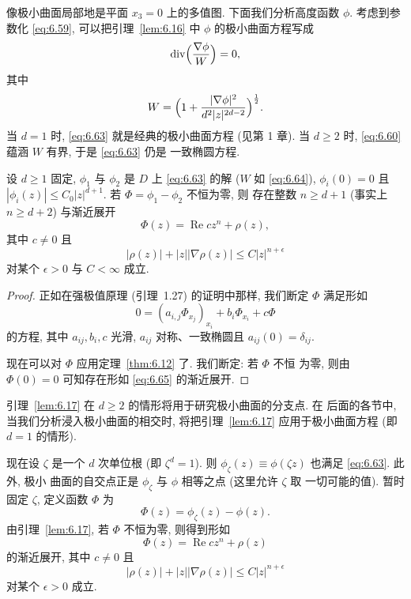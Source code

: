 像极小曲面局部地是平面 $x_3=0$ 上的多值图. 下面我们分析高度函数
$\phi$. 考虑到参数化 \eqref{eq:6.59}, 可以把引理~\ref{lem:6.16} 中
$\phi$ 的极小曲面方程写成
\begin{equation}
\operatorname{div}\Bigl(\frac{\nabla\phi}{W}\Bigr)=0,
\label{eq:6.63}
\end{equation}
其中
\begin{equation}
W=\Bigl(1+\frac{|\nabla\phi|^2}{d^2|z|^{2d-2}}\Bigr)^{\frac12}.
\label{eq:6.64}
\end{equation}
当 $d=1$ 时, \eqref{eq:6.63} 就是经典的极小曲面方程 (见第 1 章). 当
$d\geq2$ 时, \eqref{eq:6.60} 蕴涵 $W$ 有界, 于是 \eqref{eq:6.63} 仍是
一致椭圆方程.

\begin{lemma}
\label{lem:6.17}
设 $d\geq1$ 固定, $\phi_1$ 与 $\phi_2$ 是 $D$ 上 \eqref{eq:6.63} 的解
($W$ 如 \eqref{eq:6.64}), $\phi_i(0)=0$ 且
$|\phi_i(z)|\leq C_0|z|^{d+1}$. 若 $\Phi=\phi_1-\phi_2$ 不恒为零, 则
存在整数 $n\geq d+1$ (事实上 $n\geq d+2$) 与渐近展开
\begin{equation}
\Phi(z)=\operatorname{Re}cz^n+\rho(z),
\label{eq:6.65}
\end{equation}
其中 $c\neq0$ 且
\begin{equation}
|\rho(z)|+|z||\nabla\rho(z)|\leq C|z|^{n+\epsilon}
\label{eq:6.66}
\end{equation}
对某个 $\epsilon>0$ 与 $C<\infty$ 成立.
\end{lemma}

\begin{proof}
正如在强极值原理 (引理~1.27) 的证明中那样, 我们断定 $\Phi$
满足形如
\begin{equation}
0=(a_{i,j}\Phi_{x_j})_{x_i}+b_i\Phi_{x_i}+c\Phi
\label{eq:6.67}
\end{equation}
的方程, 其中 $a_{ij},b_i,c$ 光滑, $a_{ij}$ 对称、一致椭圆且
$a_{ij}(0)=\delta_{ij}$.

现在可以对 $\Phi$ 应用定理~\ref{thm:6.12} 了. 我们断定: 若 $\Phi$ 不恒
为零, 则由 $\Phi(0)=0$ 可知存在形如 \eqref{eq:6.65} 的渐近展开.
\end{proof}

引理~\ref{lem:6.17} 在 $d\geq2$ 的情形将用于研究极小曲面的分支点. 在
后面的各节中, 当我们分析浸入极小曲面的相交时, 将把引理~\ref{lem:6.17}
应用于极小曲面方程 (即 $d=1$ 的情形).

现在设 $\zeta$ 是一个 $d$ 次单位根 (即 $\zeta^d=1$). 则
$\phi_\zeta(z)\equiv\phi(\zeta z)$ 也满足 \eqref{eq:6.63}. 此外, 极小
曲面的自交点正是 $\phi_\zeta$ 与 $\phi$ 相等之点 (这里允许 $\zeta$ 取
一切可能的值). 暂时固定 $\zeta$, 定义函数 $\Phi$ 为
\begin{equation}
\Phi(z)=\phi_\zeta(z)-\phi(z).
\label{eq:6.68}
\end{equation}
由引理~\ref{lem:6.17}, 若 $\Phi$ 不恒为零, 则得到形如
\begin{equation}
\Phi(z)=\operatorname{Re}cz^n+\rho(z)
\label{eq:6.69}
\end{equation}
的渐近展开, 其中 $c\neq0$ 且
\begin{equation}
|\rho(z)|+|z||\nabla\rho(z)|\leq C|z|^{n+\epsilon}
\label{eq:6.70}
\end{equation}
对某个 $\epsilon>0$ 成立.

